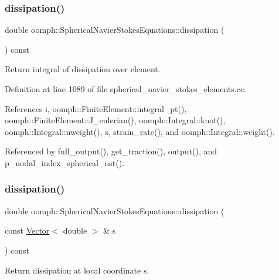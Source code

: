 \subsubsection{\texorpdfstring{dissipation()}{dissipation()}\hspace{0.1cm}{\footnotesize\ttfamily [1/2]}}
{\footnotesize\ttfamily double oomph\+::\+Spherical\+Navier\+Stokes\+Equations\+::dissipation (\begin{DoxyParamCaption}{ }\end{DoxyParamCaption}) const}



Return integral of dissipation over element. 



Definition at line 1089 of file spherical\+\_\+navier\+\_\+stokes\+\_\+elements.\+cc.



References i, oomph\+::\+Finite\+Element\+::integral\+\_\+pt(), oomph\+::\+Finite\+Element\+::\+J\+\_\+eulerian(), oomph\+::\+Integral\+::knot(), oomph\+::\+Integral\+::nweight(), s, strain\+\_\+rate(), and oomph\+::\+Integral\+::weight().



Referenced by full\+\_\+output(), get\+\_\+traction(), output(), and p\+\_\+nodal\+\_\+index\+\_\+spherical\+\_\+nst().

\mbox{\label{classoomph_1_1SphericalNavierStokesEquations_aa1eb7bc1fb7513faafeda35e948c64b8}} 
\subsubsection{\texorpdfstring{dissipation()}{dissipation()}\hspace{0.1cm}{\footnotesize\ttfamily [2/2]}}
{\footnotesize\ttfamily double oomph\+::\+Spherical\+Navier\+Stokes\+Equations\+::dissipation (\begin{DoxyParamCaption}\item[{const \hyperlink{classoomph_1_1Vector}{Vector}$<$ double $>$ \&}]{s }\end{DoxyParamCaption}) const}



Return dissipation at local coordinate s. 



